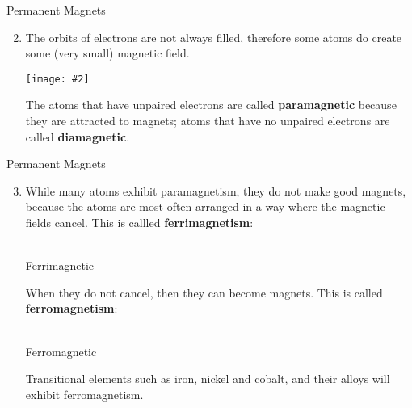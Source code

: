 \documentclass[12pt,aspectratio=169]{beamer}
\newcommand{\pic}[2]{\texttt{[image: \#2]}}
\begin{document}
\begin{frame}{Permanent Magnets}
  \begin{enumerate}
    \setcounter{enumi}{1}
  \item The orbits of electrons are not always filled, therefore some atoms do
    create some (very small) magnetic field.
    \begin{center}
      \pic{.4}{paramagnetic}
    \end{center}
    The atoms that have unpaired electrons are called \textbf{paramagnetic}
    because they are attracted to magnets; atoms that have no unpaired
    electrons are called \textbf{diamagnetic}.
  \end{enumerate}
\end{frame}



\begin{frame}{Permanent Magnets}
  \begin{enumerate}
    \setcounter{enumi}{2}
  \item While many atoms exhibit paramagnetism, they do not make good magnets,
    because the atoms are most often arranged in a way where the magnetic fields
    cancel. This is callled \textbf{ferrimagnetism}:
    \begin{center}
      \\
      Ferrimagnetic
    \end{center}
    When they do not cancel, then they can become magnets. This is called
    \textbf{ferromagnetism}:
    \begin{center}
      \\
      Ferromagnetic
    \end{center}
    Transitional elements such as iron, nickel and cobalt, and their alloys
    will exhibit ferromagnetism.
  \end{enumerate}
\end{frame}
\end{document}
